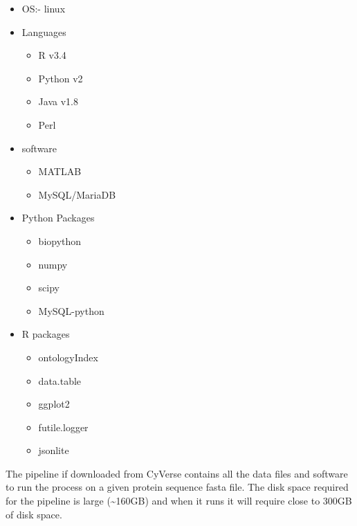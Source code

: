 \documentclass[11pt,letterpaper]{article}
\begin{document}
\begin{itemize}
 \item OS:- linux
 \item Languages
 \begin{itemize}
   \item R v3.4
   \item Python v2
   \item Java v1.8
   \item Perl
 \end{itemize}
 \item software
 \begin{itemize}
   \item MATLAB
   \item MySQL/MariaDB
 \end{itemize}

 \item Python Packages
 \begin{itemize}
  \item biopython
  \item numpy
  \item scipy
  \item MySQL-python
 \end{itemize}

 \item R packages

 \begin{itemize}
  \item ontologyIndex
  \item data.table
  \item ggplot2
  \item futile.logger
  \item jsonlite
 \end{itemize}

\end{itemize}

The pipeline if downloaded from CyVerse contains all the data files and software to run the process on a given protein sequence fasta file. The disk space required for the pipeline is large (\textasciitilde{}160GB) and when it runs it will require close to 300GB of disk space.
\end{document}
